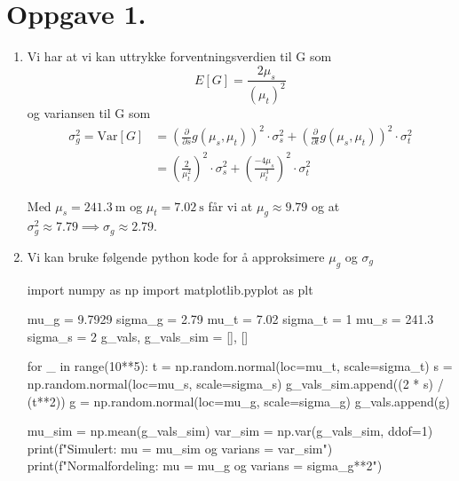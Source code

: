 \documentclass[a4paper,11pt,norsk]{article}
\begin{document}


\section*{Oppgave 1.}
\begin{enumerate}
    \item Vi har at vi kan uttrykke forventningsverdien til G som
        \[
            E[G] = \frac{2\mu_s}{(\mu_t)^2}
        \]
        og variansen til G som
        \begin{align*}
            \sigma_g^2 = \text{Var}[G] &= \left(\frac{\partial}{\partial s}g(\mu_s, \mu_t)\right)^2 \cdot \sigma_s^2 + \left(\frac{\partial}{\partial t}g(\mu_s, \mu_t)\right)^2 \cdot \sigma_t^2 \\
                          &= \left(\frac{2}{\mu_t^2}\right)^2 \cdot \sigma_s^2 + \left(\frac{-4\mu_s}{\mu_t^3}\right)^2 \cdot \sigma_t^2 
        \end{align*}

        Med $\mu_s = \SI{241.3}{\meter}$ og $\mu_t = \SI{7.02}{\s}$ får vi at $\mu_g \approx  9.79$ og at $\sigma_g^2 \approx  7.79 \implies \sigma_g \approx 2.79$.

    \item 
        Vi kan bruke følgende python kode for å approksimere $\mu_g$ og $\sigma_g$ 
\begin{pythoncode}
import numpy as np
import matplotlib.pyplot as plt

mu_g = 9.7929
sigma_g = 2.79
mu_t = 7.02
sigma_t = 1
mu_s = 241.3
sigma_s = 2
g_vals, g_vals_sim = [], []

for _ in range(10**5):
    t = np.random.normal(loc=mu_t, scale=sigma_t) 
    s = np.random.normal(loc=mu_s, scale=sigma_s) 
    g_vals_sim.append((2 * s) / (t**2))
    g = np.random.normal(loc=mu_g, scale=sigma_g)
    g_vals.append(g)

mu_sim = np.mean(g_vals_sim)
var_sim = np.var(g_vals_sim, ddof=1)
print(f"Simulert: mu = {mu_sim} og varians = {var_sim}")
print(f"Normalfordeling: mu = {mu_g} og varians = {sigma_g**2}")
\end{pythoncode}
\end{enumerate}
\end{document}
